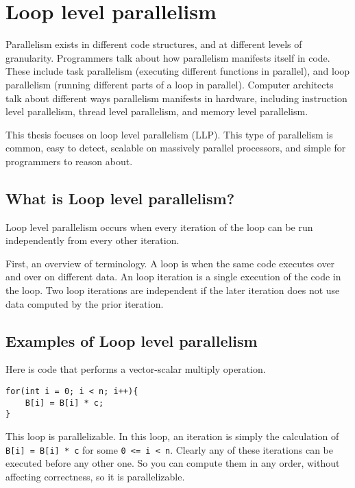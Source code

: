 \documentclass[12pt,twoside]{reedthesis}
\begin{document}
	\section{Loop level parallelism}
	
		Parallelism exists in different code structures, and at different levels of granularity. Programmers talk about how parallelism manifests itself in code. These include task parallelism (executing different functions in parallel), and  loop parallelism (running different parts of a loop in parallel). Computer architects talk about different ways parallelism manifests in hardware, including instruction level parallelism, thread level parallelism, and memory level parallelism. 
		
		This thesis focuses on loop level parallelism (LLP). This type of parallelism is common, easy to detect, scalable on massively parallel processors, and simple for programmers to reason about. 
		
		\subsection{What is Loop level parallelism?}
		
		Loop level parallelism occurs when every iteration of the loop can be run independently from every other iteration. 
		
		First, an overview of terminology. A loop is when the same code executes over and over on different data. An loop iteration is a single execution of the code in the loop. Two loop iterations are independent if the later iteration does not use data computed by the prior iteration. 
		
		\subsection{Examples of Loop level parallelism}
		
		Here is code that performs a vector-scalar multiply operation. 
		
		\begin{lstlisting}
for(int i = 0; i < n; i++){
	B[i] = B[i] * c;
}
		\end{lstlisting}
		
		This loop is parallelizable. In this loop, an iteration is simply the calculation of \texttt{B[i] = B[i] * c} for some \texttt{0 <= i < n}. Clearly any of these iterations can be executed before any other one. So you can compute them in any order, without affecting correctness, so it is parallelizable. 
		
\end{document}
